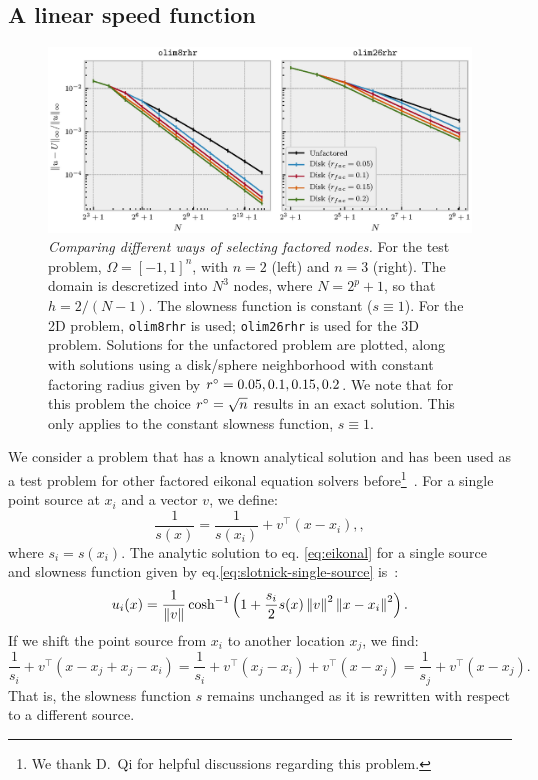 \documentclass[smallcondensed]{svjour3}
\begin{document}
\subsection{A linear speed function}\label{ssec:slotnick}

\begin{figure}
  \centering
  \includegraphics[width=\linewidth]{factoring-error-example.eps}%
  \caption{\emph{Comparing different ways of selecting factored
      nodes.} For the test problem, $\Omega = [-1, 1]^n$, with $n = 2$
    (left) and $n = 3$ (right). The domain is descretized into $N^3$
    nodes, where $N = 2^p + 1$, so that $h = 2/(N - 1)$. The slowness
    function is constant ($s \equiv 1$). For the 2D problem,
    \texttt{olim8rhr} is used; \texttt{olim26rhr} is used for the 3D
    problem. Solutions for the unfactored problem are plotted, along
    with solutions using a disk/sphere neighborhood with constant
    factoring radius given by $r^\circ = 0.05, 0.1, 0.15, 0.2$. We note
    that for this problem the choice $r^\circ = \sqrt{n}$ results in an
    exact solution. This only applies to the constant slowness
    function, $s \equiv 1$.  }\label{fig:factoring-error-example}
\end{figure}

We consider a problem that has a known analytical solution and has
been used as a test problem for other factored eikonal equation
solvers before\footnote{We thank D.\ Qi for helpful discussions
  regarding this
  problem.}~\cite{slotnick1959lessons,fomel2009fast,qi2018corner}. For
a single point source at $x_i$ and a vector $v$, we define:
\begin{equation}
  \label{eq:slotnick-single-source}
  \frac{1}{s(x)} = \frac{1}{s(x_i)} + v^\top {(x - x_i)},,
\end{equation}
where $s_i = s(x_i)$. The analytic solution to eq.\@
\ref{eq:eikonal} for a single source and slowness function given by
eq.\@ \ref{eq:slotnick-single-source}
is~\cite{slotnick1959lessons}:
\begin{equation}
  \label{eq:slotnick-single-source-solution}
  u_i(x) = \frac{1}{\left\|v\right\|} \cosh^{-1} \left(1 + \frac{s_i}{2} s(x) \left\|v\right\|^2 \left\|x - x_i\right\|^2\right).
\end{equation}
If we shift the point source from $x_i$ to another location $x_j$, we
find:
\begin{equation}
  \label{eq:slotnick-slowness-shift}
  \frac{1}{s_i} + v^\top {(x - x_j + x_j - x_i)} = \frac{1}{s_i} + v^\top {(x_j - x_i)} + v^\top {(x - x_j)} = \frac{1}{s_j} + v^\top {(x - x_j)}.
\end{equation}
That is, the slowness function $s$ remains unchanged as it is
rewritten with respect to a different source.
\end{document}
